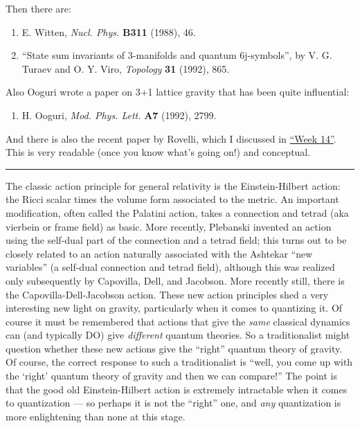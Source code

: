 \documentclass{article}
\def\tightlist{}
\renewcommand{\texttt}[1]{%
  \begingroup
  \ttfamily
  \begingroup\lccode`~=`/\lowercase{\endgroup\def~}{/\discretionary{}{}{}}%
  \begingroup\lccode`~=`[\lowercase{\endgroup\def~}{[\discretionary{}{}{}}%
  \begingroup\lccode`~=`.\lowercase{\endgroup\def~}{.\discretionary{}{}{}}%
  \catcode`/=\active\catcode`[=\active\catcode`.=\active
  \scantokens{#1\noexpand}%
  \endgroup
}
\begin{document}
Then there are:

\begin{enumerate}
\def\labelenumi{\arabic{enumi})}
\setcounter{enumi}{6}
\item
  E. Witten, \emph{Nucl. Phys.} \textbf{B311} (1988), 46.
\item
  ``State sum invariants of 3-manifolds and quantum 6j-symbols'', by V.
  G. Turaev and O. Y. Viro, \emph{Topology} \textbf{31} (1992), 865.
\end{enumerate}

Also Ooguri wrote a paper on 3+1 lattice gravity that has been quite
influential:

\begin{enumerate}
\def\labelenumi{\arabic{enumi})}
\setcounter{enumi}{8}
\tightlist
\item
  H. Ooguri, \emph{Mod. Phys. Lett.} \textbf{A7} (1992), 2799.
\end{enumerate}

And there is also the recent paper by Rovelli, which I discussed in
\protect\hyperlink{week14}{``Week 14''}. This is very readable (once you
know what's going on!) and conceptual.

\begin{center}\rule{0.5\linewidth}{0.5pt}\end{center}


The classic action principle for general relativity is the
Einstein-Hilbert action: the Ricci scalar times the volume form
associated to the metric. An important modification, often called the
Palatini action, takes a connection and tetrad (aka vierbein or frame
field) as basic. More recently, Plebanski invented an action using the
self-dual part of the connection and a tetrad field; this turns out to
be closely related to an action naturally associated with the Ashtekar
``new variables'' (a self-dual connection and tetrad field), although
this was realized only subsequently by Capovilla, Dell, and Jacobson.
More recently still, there is the Capovilla-Dell-Jacobson action. These
new action principles shed a very interesting new light on gravity,
particularly when it comes to quantizing it. Of course it must be
remembered that actions that give the \emph{same} classical dynamics can
(and typically DO) give \emph{different} quantum theories. So a
traditionalist might question whether these new actions give the
``right'' quantum theory of gravity. Of course, the correct response to
such a traditionalist is ``well, you come up with the `right' quantum
theory of gravity and then we can compare!'' The point is that the good
old Einstein-Hilbert action is extremely intractable when it comes to
quantization --- so perhaps it is not the ``right'' one, and \emph{any}
quantization is more enlightening than none at this stage.
\end{document}
